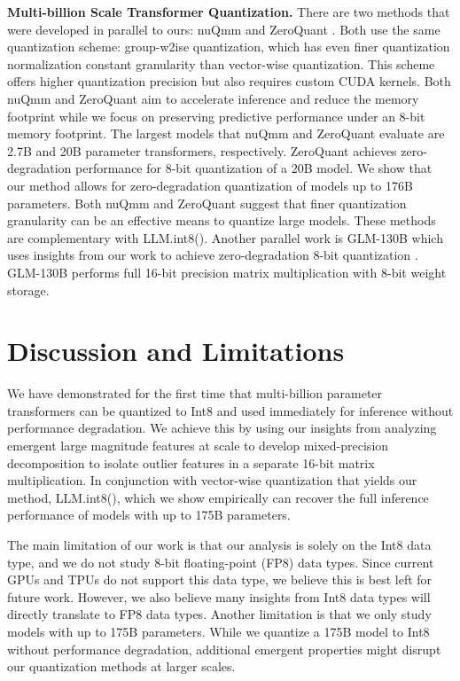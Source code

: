 \textbf{Multi-billion Scale Transformer Quantization.} There are two methods that were developed in parallel to ours: nuQmm \citep{park2022nuqmm} and ZeroQuant \citep{yao2022zeroquant}. Both use the same quantization scheme: group-w2ise quantization, which has even finer quantization normalization constant granularity than vector-wise quantization. This scheme offers higher quantization precision but also requires custom CUDA kernels. Both nuQmm and ZeroQuant aim to accelerate inference and reduce the memory footprint while we focus on preserving predictive performance under an 8-bit memory footprint. The largest models that nuQmm and ZeroQuant evaluate are 2.7B and 20B parameter transformers, respectively. ZeroQuant achieves zero-degradation performance for 8-bit quantization of a 20B model. We show that our method allows for zero-degradation quantization of models up to 176B parameters. Both nuQmm and ZeroQuant suggest that finer quantization granularity can be an effective means to quantize large models. These methods are complementary with LLM.int8(). Another parallel work is GLM-130B which uses insights from our work to achieve zero-degradation 8-bit quantization \citep{zeng2022glm}. GLM-130B performs full 16-bit precision matrix multiplication with 8-bit weight storage.

\section{Discussion and Limitations}

We have demonstrated for the first time that multi-billion parameter transformers can be quantized to Int8 and used immediately for inference without performance degradation. We achieve this by using our insights from analyzing emergent large magnitude features at scale to develop mixed-precision decomposition to isolate outlier features in a separate 16-bit matrix multiplication. In conjunction with vector-wise quantization that yields our method, LLM.int8(), which we show empirically can recover the full inference performance of models with up to  175B parameters.

The main limitation of our work is that our analysis is solely on the Int8 data type, and we do not study 8-bit floating-point (FP8) data types. Since current GPUs and TPUs do not support this data type, we believe this is best left for future work. However, we also believe many insights from Int8 data types will directly translate to FP8 data types. Another limitation is that we only study models with up to 175B parameters. While we quantize a 175B model to Int8 without performance degradation, additional emergent properties might disrupt our quantization methods at larger scales.

